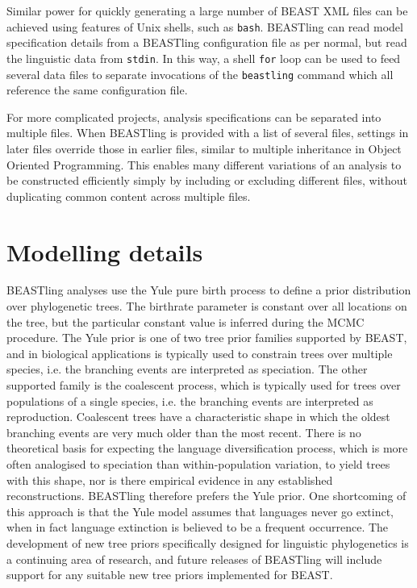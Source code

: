 \documentclass[twocolumn,10pt]{scrartcl}
\begin{document}
Similar power for quickly generating a large number of BEAST XML files can be achieved using features of Unix shells, such as \texttt{bash}.  BEASTling can read model specification details from a BEASTling configuration file as per normal, but read the linguistic data from \texttt{stdin}.  In this way, a shell \texttt{for} loop can be used to feed several data files to separate invocations of the \texttt{beastling} command which all reference the same configuration file.

For more complicated projects, analysis specifications can be separated into multiple files.  When BEASTling is provided with a list of several files, settings in later files override those in earlier files, similar to multiple inheritance in Object Oriented Programming.  This enables many different variations of an analysis to be constructed efficiently simply by including or excluding different files, without duplicating common content across multiple files.

\section{Modelling details}

BEASTling analyses use the Yule pure birth process\cite{Yule1924} to define a prior distribution over phylogenetic trees.  The birthrate parameter is constant over all locations on the tree, but the particular constant value is inferred during the MCMC procedure.  The Yule prior is one of two tree prior families supported by BEAST, and in biological applications is typically used to constrain trees over multiple species, i.e. the branching events are interpreted as speciation.  The other supported family is the coalescent process\cite{Kingman1982}, which is typically used for trees over populations of a single species, i.e. the branching events are interpreted as reproduction.  Coalescent trees have a characteristic shape in which the oldest branching events are very much older than the most recent.  There is no theoretical basis for expecting the language diversification process, which is more often analogised to speciation than within-population variation, to yield trees with this shape, nor is there empirical evidence in any established reconstructions.  BEASTling therefore prefers the Yule prior.  One shortcoming of this approach is that the Yule model assumes that languages never go extinct, when in fact language extinction is believed to be a frequent occurrence.  The development of new tree priors specifically designed for linguistic phylogenetics is a continuing area of research, and future releases of BEASTling will include support for any suitable new tree priors implemented for BEAST.
\end{document}
